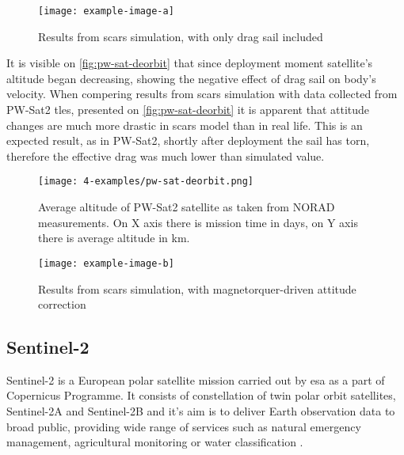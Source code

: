             \begin{figure}[H]
                \centering
                \texttt{[image: example-image-a]}
                \caption{Results from \ac{scars} simulation, with only drag sail included}
                \label{fig:scars-deorbit}
            \end{figure}

            It is visible on \autoref{fig:pw-sat-deorbit} that since deployment moment satellite's altitude began decreasing, showing the negative effect of drag sail on body's velocity. When compering results from \ac{scars} simulation with data collected from PW-Sat2 \ac{tle}s, presented on \autoref{fig:pw-sat-deorbit} it is apparent that attitude changes are much more drastic in \ac{scars} model than in real life. This is an expected result, as in PW-Sat2, shortly after deployment the sail has torn, therefore the effective drag was much lower than simulated value. 
            
            \begin{figure}[H]
                \centering
                \texttt{[image: 4-examples/pw-sat-deorbit.png]}
                \caption{Average altitude of PW-Sat2 satellite as taken from NORAD measurements. On X axis there is mission time in days, on Y axis there is average altitude in km.}
                \label{fig:pw-sat-deorbit}
            \end{figure}
            
            \begin{figure}[H]
                \centering
                \texttt{[image: example-image-b]}
                \caption{Results from \ac{scars} simulation, with magnetorquer-driven attitude correction}
                \label{fig:scars-deorbit3}
            \end{figure}




    \subsection{Sentinel-2} 
    
    Sentinel-2 is a European polar satellite mission carried out by \ac{esa} as a part of Copernicus Programme. It consists of constellation of twin polar orbit satellites, Sentinel-2A and Sentinel-2B and it's aim is to deliver Earth observation data to broad public, providing wide range of services such as natural emergency management, agricultural monitoring or water classification  \cite{sentinelreference_description}.

